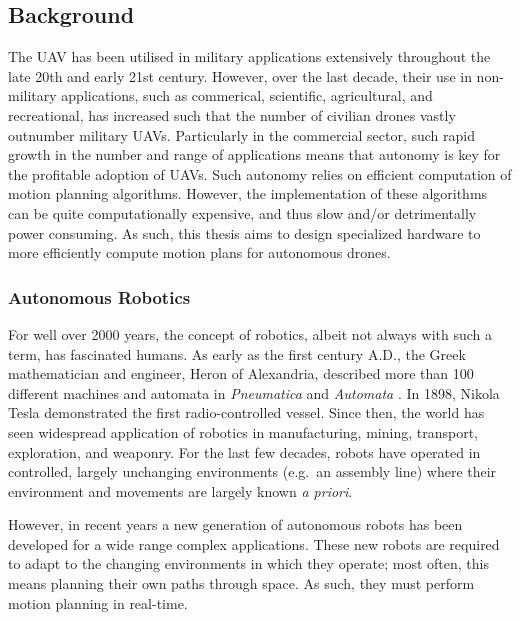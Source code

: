 
\subsection{Background}
    
    The \gls{UAV} has been utilised in military applications extensively throughout the late 20th and early 21st century. However, over the last decade, their use in non-military applications, such as commerical, scientific, agricultural, and recreational, has increased such that the number of civilian drones vastly outnumber military \gls{UAV}s. Particularly in the commercial sector, such rapid growth in the number and range of applications means that autonomy is key for the profitable adoption of \gls{UAV}s. Such autonomy relies on efficient computation of motion planning algorithms. However, the implementation of these algorithms can be quite computationally expensive, and thus slow and/or detrimentally power consuming. As such, this thesis aims to design specialized hardware to more efficiently compute motion plans for autonomous drones.

    \subsubsection{Autonomous Robotics}
        For well over 2000 years, the concept of robotics, albeit not always with such a term, has fascinated humans. As early as the first century A.D., the Greek mathematician and engineer, Heron of Alexandria, described more than 100 different machines and \gls{automata} in \textit{Pneumatica} and \textit{Automata} \cite{Alexandrinus}. In 1898, Nikola Tesla demonstrated the first radio-controlled vessel. Since then, the world has seen widespread application of robotics in manufacturing, mining, transport, exploration, and weaponry. For the last few decades, robots have operated in controlled, largely unchanging environments (e.g.\ an assembly line) where their environment and movements are largely known \textit{\gls{a priori}}.

        However, in recent years a new generation of autonomous robots has been developed for a wide range complex applications. These new robots are required to adapt to the changing environments in which they operate; most often, this means planning their own paths through space. As such, they must perform motion planning in \gls{real-time}.

